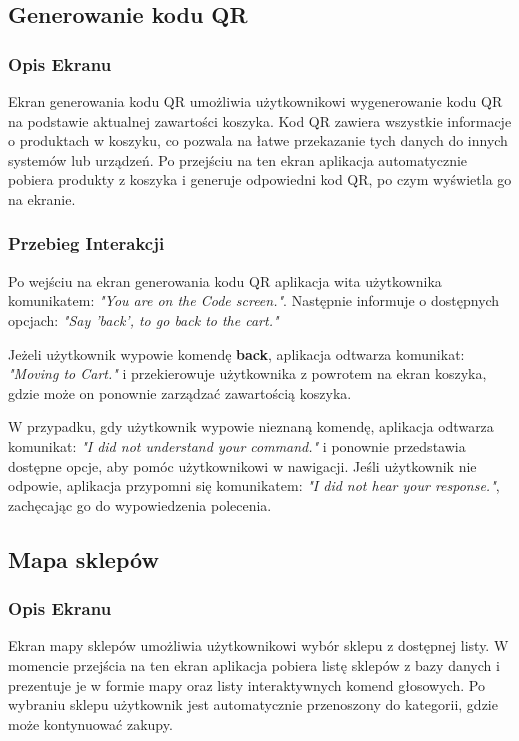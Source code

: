 \subsection{Generowanie kodu QR}

\subsubsection{Opis Ekranu}
Ekran generowania kodu QR umożliwia użytkownikowi wygenerowanie kodu QR na podstawie aktualnej zawartości koszyka. Kod QR zawiera wszystkie informacje o produktach w koszyku, co pozwala na łatwe przekazanie tych danych do innych systemów lub urządzeń. Po przejściu na ten ekran aplikacja automatycznie pobiera produkty z koszyka i generuje odpowiedni kod QR, po czym wyświetla go na ekranie.

\subsubsection{Przebieg Interakcji}
Po wejściu na ekran generowania kodu QR aplikacja wita użytkownika komunikatem: \textit{"You are on the Code screen."}. Następnie informuje o dostępnych opcjach: \textit{"Say 'back', to go back to the cart."}

Jeżeli użytkownik wypowie komendę \textbf{back}, aplikacja odtwarza komunikat: \textit{"Moving to Cart."} i przekierowuje użytkownika z powrotem na ekran koszyka, gdzie może on ponownie zarządzać zawartością koszyka.

W przypadku, gdy użytkownik wypowie nieznaną komendę, aplikacja odtwarza komunikat: \textit{"I did not understand your command."} i ponownie przedstawia dostępne opcje, aby pomóc użytkownikowi w nawigacji. Jeśli użytkownik nie odpowie, aplikacja przypomni się komunikatem: \textit{"I did not hear your response."}, zachęcając go do wypowiedzenia polecenia.


\subsection{Mapa sklepów}

\subsubsection{Opis Ekranu}
Ekran mapy sklepów umożliwia użytkownikowi wybór sklepu z dostępnej listy. W momencie przejścia na ten ekran aplikacja pobiera listę sklepów z bazy danych i prezentuje je w formie mapy oraz listy interaktywnych komend głosowych. Po wybraniu sklepu użytkownik jest automatycznie przenoszony do kategorii, gdzie może kontynuować zakupy.


